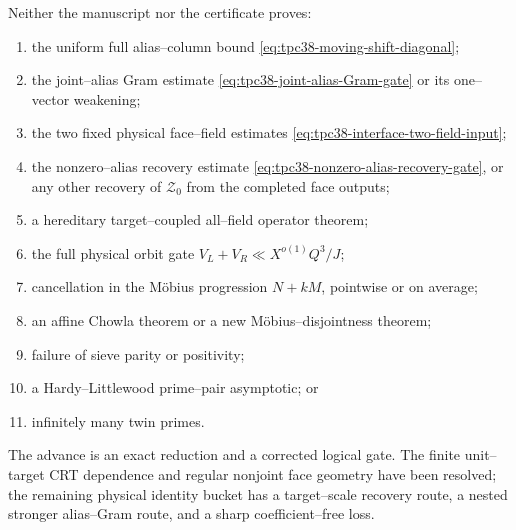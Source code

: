 Neither the manuscript nor the certificate proves:
\begin{enumerate}[label=(\roman*)]
 \item the uniform full alias--column bound
 \eqref{eq:tpc38-moving-shift-diagonal};
 \item the joint--alias Gram estimate
 \eqref{eq:tpc38-joint-alias-Gram-gate} or its one--vector weakening;
 \item the two fixed physical face--field estimates
 \eqref{eq:tpc38-interface-two-field-input};
 \item the nonzero--alias recovery estimate
 \eqref{eq:tpc38-nonzero-alias-recovery-gate}, or any other recovery of
 \(\mathscr Z_0\) from the completed face outputs;
 \item a hereditary target--coupled all--field operator theorem;
 \item the full physical orbit gate
 \(V_L+V_R\ll X^{o(1)}Q^3/J\);
 \item cancellation in the M\"obius progression
 \(N+kM\), pointwise or on average;
 \item an affine Chowla theorem or a new M\"obius--disjointness theorem;
 \item failure of sieve parity or positivity;
 \item a Hardy--Littlewood prime--pair asymptotic; or
 \item infinitely many twin primes.
\end{enumerate}

The advance is an exact reduction and a corrected logical gate.  The finite
unit--target CRT dependence and regular nonjoint face geometry have been resolved; the
remaining physical identity bucket has a target--scale recovery route, a
nested stronger alias--Gram route, and a sharp coefficient--free loss.
